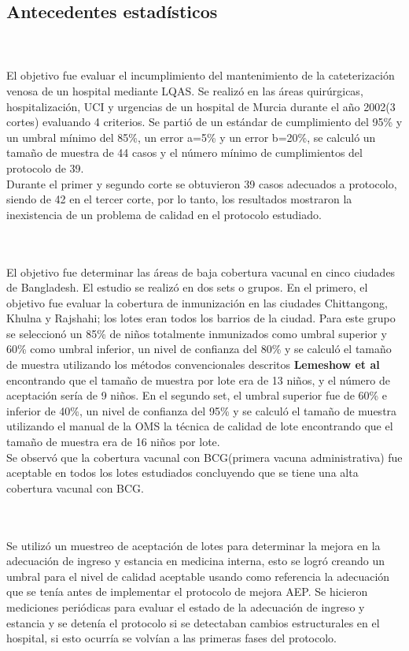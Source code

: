 \subsection{Antecedentes estad\'{i}sticos}
~\\\textbf{\citet{AE1}}
~\\El objetivo fue evaluar el incumplimiento del mantenimiento de la cateterizaci\'{o}n venosa de un hospital mediante LQAS. Se realiz\'{o} en las \'{a}reas quir\'{u}rgicas, hospitalizaci\'{o}n, UCI y urgencias de un hospital de Murcia durante el a\~{n}o 2002(3 cortes) evaluando 4 criterios. Se parti\'{o} de un est\'{a}ndar de cumplimiento del 95\% y un umbral m\'{i}nimo del 85\%, un error a=5\% y un error b=20\%, se calcul\'{o} un tama\~{n}o de muestra de 44 casos y el n\'{u}mero m\'{i}nimo de cumplimientos del protocolo de 39.
~\\Durante el primer y segundo corte se obtuvieron 39 casos adecuados a protocolo, siendo de 42 en el tercer corte, por lo tanto, los resultados mostraron la inexistencia de un problema de calidad en el protocolo estudiado.

~\\\textbf{\citet{AE2}}
~\\El objetivo fue determinar las \'{a}reas de baja cobertura vacunal en cinco ciudades de Bangladesh. El estudio se realiz\'{o} en dos sets o grupos. En el primero, el objetivo fue evaluar la cobertura de inmunizaci\'{o}n en las ciudades Chittangong, Khulna y Rajshahi; los lotes eran todos los barrios de la ciudad. Para este grupo se seleccion\'{o} un 85\% de ni\~{n}os totalmente inmunizados como umbral superior y 60\% como umbral inferior, un nivel de confianza del 80\% y se calcul\'{o} el tama\~{n}o de muestra utilizando los m\'{e}todos convencionales descritos \textbf{Lemeshow et al} encontrando que el tama\~{n}o de muestra  por lote era de 13 ni\~{n}os, y el n\'{u}mero de aceptaci\'{o}n ser\'{i}a de 9 ni\~{n}os. En el segundo set, el umbral superior fue de 60\% e inferior de 40\%, un nivel de confianza del 95\% y se calcul\'{o} el tama\~{n}o de muestra utilizando el manual de la OMS la t\'{e}cnica de calidad de lote encontrando que el tama\~{n}o de muestra era de 16 ni\~{n}os por lote.
~\\Se observ\'{o} que la cobertura vacunal con BCG(primera vacuna administrativa) fue aceptable en todos los lotes estudiados concluyendo que se tiene una alta cobertura vacunal con BCG.

~\\\textbf{\citet{AE3}}
~\\Se utiliz\'{o} un muestreo de aceptaci\'{o}n de lotes para determinar la mejora en la adecuaci\'{o}n de ingreso y estancia en medicina interna, esto se logr\'{o} creando un umbral para el nivel de calidad aceptable usando como referencia la adecuaci\'{o}n que se ten\'{i}a antes de implementar el protocolo de mejora AEP. Se hicieron mediciones peri\'{o}dicas para evaluar el estado de la adecuaci\'{o}n de ingreso y estancia y se deten\'{i}a el protocolo si se detectaban cambios estructurales en el hospital, si esto ocurr\'{i}a se volv\'{i}an a las primeras fases del protocolo.

